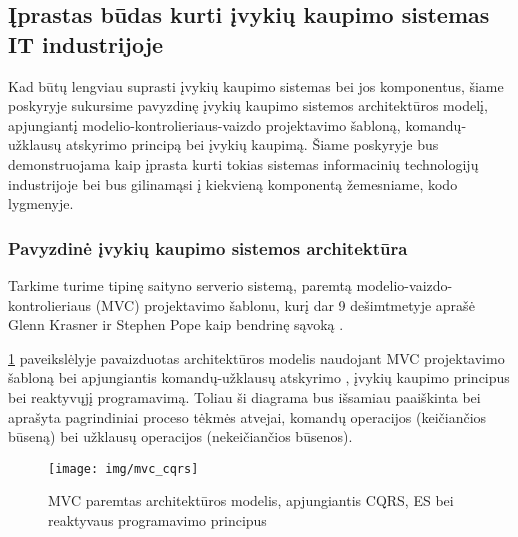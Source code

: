 


\subsection{Įprastas būdas kurti įvykių kaupimo sistemas IT industrijoje}

Kad būtų lengviau suprasti įvykių kaupimo sistemas bei jos komponentus, šiame poskyryje sukursime pavyzdinę įvykių kaupimo sistemos architektūros modelį, apjungiantį modelio-kontrolieriaus-vaizdo projektavimo šabloną, komandų-užklausų atskyrimo principą bei įvykių kaupimą. Šiame poskyryje bus demonstruojama kaip įprasta kurti tokias sistemas informacinių technologijų industrijoje bei bus gilinamąsi į kiekvieną komponentą žemesniame, kodo lygmenyje.

\subsubsection{Pavyzdinė įvykių kaupimo sistemos architektūra}

Tarkime turime tipinę saityno serverio sistemą, paremtą modelio-vaizdo-kontrolieriaus (MVC) projektavimo šablonu, kurį dar 9 dešimtmetyje aprašė Glenn Krasner ir Stephen Pope kaip bendrinę sąvoką \cite{Krasner:1988:CUM:50757.50759}.

\ref{img:mvc_cqrs} paveikslėlyje pavaizduotas architektūros modelis naudojant MVC projektavimo šabloną bei apjungiantis komandų-užklausų atskyrimo , įvykių kaupimo principus bei reaktyvųjį programavimą. Toliau ši diagrama bus išsamiau paaiškinta bei aprašyta pagrindiniai proceso tėkmės atvejai, komandų operacijos (keičiančios būseną) bei užklausų operacijos (nekeičiančios būsenos).

\begin{figure}[H]
    \centering
    \texttt{[image: img/mvc\_cqrs]}
    \caption{MVC paremtas architektūros modelis, apjungiantis CQRS, ES bei reaktyvaus programavimo principus}
    \label{img:mvc_cqrs}
\end{figure}

